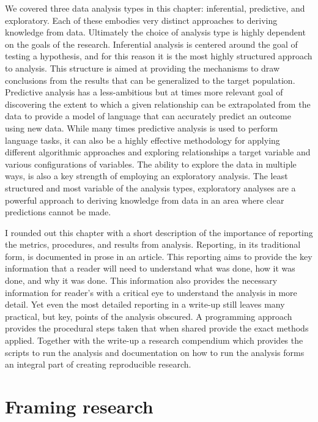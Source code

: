\documentclass[
]{article}
\begin{document}
We covered three data analysis types in this chapter: inferential, predictive, and exploratory. Each of these embodies very distinct approaches to deriving knowledge from data. Ultimately the choice of analysis type is highly dependent on the goals of the research. Inferential analysis is centered around the goal of testing a hypothesis, and for this reason it is the most highly structured approach to analysis. This structure is aimed at providing the mechanisms to draw conclusions from the results that can be generalized to the target population. Predictive analysis has a less-ambitious but at times more relevant goal of discovering the extent to which a given relationship can be extrapolated from the data to provide a model of language that can accurately predict an outcome using new data. While many times predictive analysis is used to perform language tasks, it can also be a highly effective methodology for applying different algorithmic approaches and exploring relationships a target variable and various configurations of variables. The ability to explore the data in multiple ways, is also a key strength of employing an exploratory analysis. The least structured and most variable of the analysis types, exploratory analyses are a powerful approach to deriving knowledge from data in an area where clear predictions cannot be made.

I rounded out this chapter with a short description of the importance of reporting the metrics, procedures, and results from analysis. Reporting, in its traditional form, is documented in prose in an article. This reporting aims to provide the key information that a reader will need to understand what was done, how it was done, and why it was done. This information also provides the necessary information for reader's with a critical eye to understand the analysis in more detail. Yet even the most detailed reporting in a write-up still leaves many practical, but key, points of the analysis obscured. A programming approach provides the procedural steps taken that when shared provide the exact methods applied. Together with the write-up a research compendium which provides the scripts to run the analysis and documentation on how to run the analysis forms an integral part of creating reproducible research.

\hypertarget{framing-research}{%
\section{Framing research}\label{framing-research}}
\end{document}
